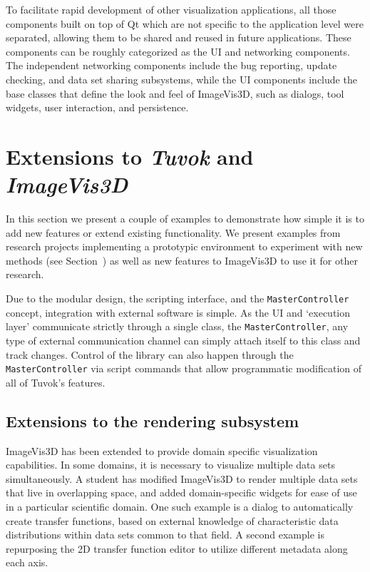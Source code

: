 To facilitate rapid development of other visualization applications,
all those components built on top of Qt which are
not specific to the application level were separated, allowing
them to be shared and reused in future applications. These
components can be roughly categorized as the UI and networking
components. The independent networking components
include the bug reporting, update checking, and data
set sharing subsystems, while the UI components include
the base classes that define the look and feel of ImageVis3D,
such as dialogs, tool widgets, user interaction, and persistence.

\section{Extensions to \textit{Tuvok} and \textit{ImageVis3D}}
\label{sec:tvk-extensions}

In this section we present a couple of examples to
demonstrate how simple it is to add new features or extend
existing functionality. We present examples from research
projects implementing a prototypic environment to experiment
with new methods (see Section~\todo{\ref{fixme}}) as well as new
features to ImageVis3D to use it for other research.

Due to the modular design, the scripting interface, and
the \texttt{MasterController} concept, integration with external software
is simple. As the UI and `execution layer' communicate
strictly through a single class, the \texttt{MasterController}, any
type of external communication channel can simply attach
itself to this class and track changes. Control of the library
can also happen through the \texttt{MasterController} via script
commands that allow programmatic modification of all of
Tuvok's features.

\subsection{Extensions to the rendering subsystem}

ImageVis3D has been extended to provide domain specific
visualization capabilities. In some domains, it is necessary
to visualize multiple data sets simultaneously. A student has
modified ImageVis3D to render multiple data sets that live in
overlapping space, and added domain-specific widgets for
ease of use in a particular scientific domain. One such example
is a dialog to automatically create transfer functions,
based on external knowledge of characteristic data distributions
within data sets common to that field. A second example
is repurposing the 2D transfer function editor to utilize
different metadata along each axis.

